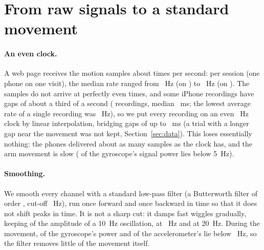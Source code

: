 \section{From raw signals to a standard movement}\label{sec:processing}

\paragraph{An even clock.} A web page receives the motion samples about  times per second:
per session (one phone on one visit), the median rate ranged from ~Hz (on
) to ~Hz (on ). The samples do not arrive at perfectly even times, and some iPhone recordings have gaps of about a third of a
second ( recordings, median ~ms; the lowest average
rate of a single recording was ~Hz), so we put every recording on an even
~Hz clock by linear interpolation, bridging gaps of up to ~ms (a trial with a
longer gap near the movement was not kept, Section~\ref{sec:data}). This loses
essentially nothing: the phones delivered about as many samples as the clock has, and the arm movement is slow
( of the gyroscope's signal power lies below 5~Hz).

\paragraph{Smoothing.} We smooth every channel with a standard low-pass filter (a Butterworth filter of order
, cut-off ~Hz), run once forward and once backward in time so that it
does not shift peaks in time. It is not a sharp cut: it damps fast wiggles gradually, keeping
 of the amplitude of a 10~Hz oscillation,  at
~Hz and  at 20~Hz. During the movement,
 of the gyroscope's power and  of the
accelerometer's lie below ~Hz, so the filter removes little of the movement itself.

